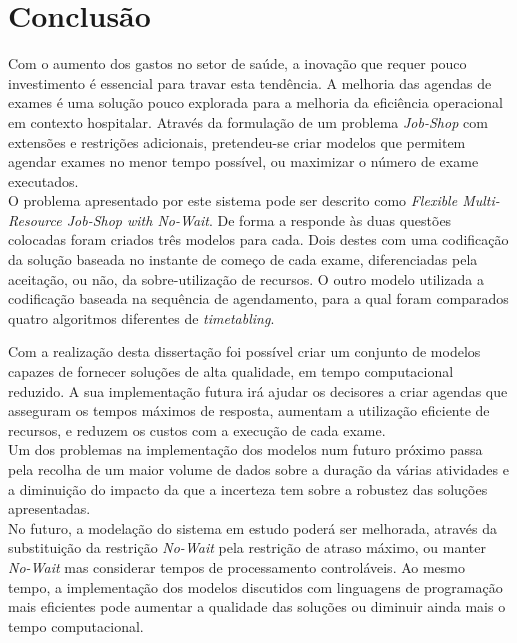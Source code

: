 
%


\epigraphfontsize{\small\itshape}
\setlength\epigraphwidth{12.5cm}
\setlength\epigraphrule{0pt}

\chapter{Conclusão}
\label{cha:conclusão}

Com o aumento dos gastos no setor de saúde, a inovação que requer pouco investimento é essencial para travar esta tendência. A melhoria das agendas de exames é uma solução pouco explorada para a melhoria da eficiência operacional em contexto hospitalar. Através da formulação de um problema \textit{Job-Shop} com extensões e restrições adicionais, pretendeu-se criar modelos que permitem agendar exames no menor tempo possível, ou maximizar o número de exame executados.\\

O problema apresentado por este sistema pode ser descrito como \textit{Flexible Multi-Resource Job-Shop with No-Wait}. De forma a responde às duas questões colocadas foram criados três modelos para cada. Dois destes com uma codificação da solução baseada no instante de começo de cada exame, diferenciadas pela aceitação, ou não, da sobre-utilização de recursos. O outro modelo utilizada a codificação baseada na sequência de agendamento, para a qual foram comparados quatro algoritmos diferentes de \textit{timetabling}.

Com a realização desta dissertação foi possível criar um conjunto de modelos capazes de fornecer soluções de alta qualidade, em tempo computacional reduzido. A sua implementação futura irá ajudar os decisores a criar agendas que asseguram os tempos máximos de resposta, aumentam a utilização eficiente de recursos, e reduzem os custos com a execução de cada exame.\\

Um dos problemas na implementação dos modelos num futuro próximo passa pela recolha de um maior volume de dados sobre a duração da várias atividades e a diminuição do impacto da que a incerteza tem sobre a robustez das soluções apresentadas.\\

No futuro, a modelação do sistema em estudo poderá ser melhorada, através da substituição da restrição \textit{No-Wait} pela restrição de atraso máximo, ou manter \textit{No-Wait} mas considerar tempos de processamento controláveis. Ao mesmo tempo, a implementação dos modelos discutidos com linguagens de programação mais eficientes pode aumentar a qualidade das soluções ou diminuir ainda mais o tempo computacional.\\

